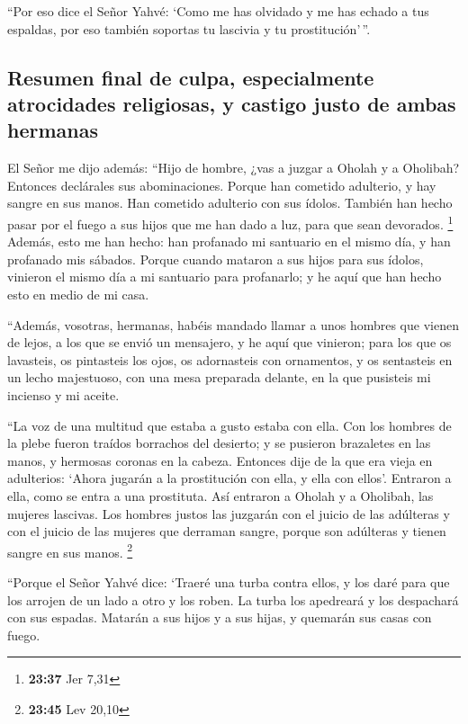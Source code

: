 \begin{paracol}{2}
 ``Por eso dice el Señor Yahvé: `Como me has olvidado y
me has echado a tus espaldas, por eso también soportas tu lascivia y tu
prostitución'\,''.

\hypertarget{resumen-final-de-culpa-especialmente-atrocidades-religiosas-y-castigo-justo-de-ambas-hermanas}{%
\subsection{Resumen final de culpa, especialmente atrocidades
religiosas, y castigo justo de ambas
hermanas}\label{resumen-final-de-culpa-especialmente-atrocidades-religiosas-y-castigo-justo-de-ambas-hermanas}}

 El Señor me dijo además: ``Hijo de hombre, ¿vas a juzgar
a Oholah y a Oholibah? Entonces declárales sus abominaciones.
 Porque han cometido adulterio, y hay sangre en sus
manos. Han cometido adulterio con sus ídolos. También han hecho pasar
por el fuego a sus hijos que me han dado a luz, para que sean devorados.
\footnote{\textbf{23:37} Jer 7,31}  Además, esto me han
hecho: han profanado mi santuario en el mismo día, y han profanado mis
sábados.  Porque cuando mataron a sus hijos para sus
ídolos, vinieron el mismo día a mi santuario para profanarlo; y he aquí
que han hecho esto en medio de mi casa.

 ``Además, vosotras, hermanas, habéis mandado llamar a
unos hombres que vienen de lejos, a los que se envió un mensajero, y he
aquí que vinieron; para los que os lavasteis, os pintasteis los ojos, os
adornasteis con ornamentos,  y os sentasteis en un lecho
majestuoso, con una mesa preparada delante, en la que pusisteis mi
incienso y mi aceite.

 ``La voz de una multitud que estaba a gusto estaba con
ella. Con los hombres de la plebe fueron traídos borrachos del desierto;
y se pusieron brazaletes en las manos, y hermosas coronas en la cabeza.
 Entonces dije de la que era vieja en adulterios: `Ahora
jugarán a la prostitución con ella, y ella con ellos'. 
Entraron a ella, como se entra a una prostituta. Así entraron a Oholah y
a Oholibah, las mujeres lascivas.  Los hombres justos las
juzgarán con el juicio de las adúlteras y con el juicio de las mujeres
que derraman sangre, porque son adúlteras y tienen sangre en sus manos.
\footnote{\textbf{23:45} Lev 20,10}

 ``Porque el Señor Yahvé dice: `Traeré una turba contra
ellos, y los daré para que los arrojen de un lado a otro y los roben.
 La turba los apedreará y los despachará con sus espadas.
Matarán a sus hijos y a sus hijas, y quemarán sus casas con fuego.


\end{paracol}

